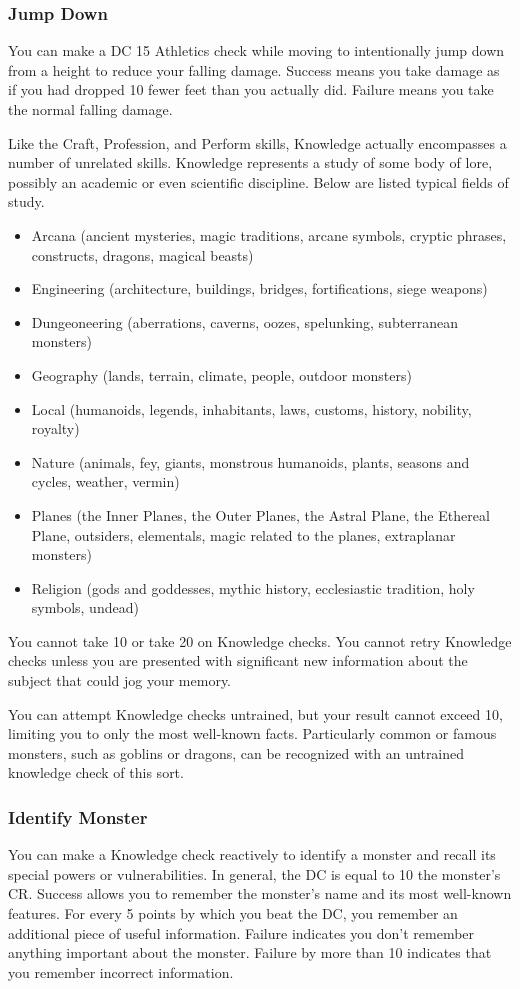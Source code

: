 \subsubsection{Jump Down}
You can make a DC 15 Athletics check while moving to intentionally jump down from a height to reduce your falling damage. Success means you take damage as if you had dropped 10 fewer feet than you actually did. Failure means you take the normal falling damage.

Like the Craft, Profession, and Perform skills, Knowledge actually encompasses a number of unrelated skills. Knowledge represents a study of some body of lore, possibly an academic or even scientific discipline. Below are listed typical fields of study.
\begin{itemize}
\item Arcana (ancient mysteries, magic traditions, arcane symbols,
cryptic phrases, constructs, dragons, magical beasts)
\item Engineering (architecture, buildings, bridges, fortifications, siege weapons)
\item Dungeoneering (aberrations, caverns, oozes, spelunking, subterranean monsters)
\item Geography (lands, terrain, climate, people, outdoor monsters)
\item Local (humanoids, legends, inhabitants, laws, customs, history, nobility, royalty)
\item Nature (animals, fey, giants, monstrous humanoids, plants, seasons and cycles, weather, vermin)
\item Planes (the Inner Planes, the Outer Planes, the Astral Plane,
the Ethereal Plane, outsiders, elementals, magic related to the planes, extraplanar monsters)
\item Religion (gods and goddesses, mythic history, ecclesiastic tradition, holy symbols, undead)
\end{itemize}

You cannot take 10 or take 20 on Knowledge checks. You cannot retry Knowledge checks unless you are presented with significant new information about the subject that could jog your memory.

You can attempt Knowledge checks untrained, but your result cannot exceed 10, limiting you to only the most well-known facts. Particularly common or famous monsters, such as goblins or dragons, can be recognized with an untrained knowledge check of this sort.

\subsubsection{Identify Monster}
You can make a Knowledge check reactively to identify a monster and recall its special powers or vulnerabilities. In general, the DC is equal to 10 \add the monster's CR. Success allows you to remember the monster's name and its most well-known features. For every 5 points by which you beat the DC, you remember an additional piece of useful information. Failure indicates you don't remember anything important about the monster. Failure by more than 10 indicates that you remember incorrect information.

